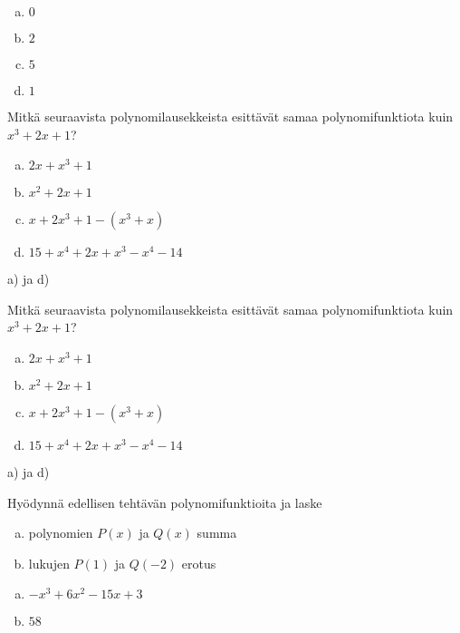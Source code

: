 \begin{tehtavasivu}
\begin{tehtava}
	\begin{vastaus}
		\begin{enumerate}[a)]
			\item $0$
			\item $2$
			\item $5$
			\item $1$
		\end{enumerate}
	\end{vastaus}
\end{tehtava}

\begin{tehtava}
	Mitkä seuraavista polynomilausekkeista esittävät samaa polynomifunktiota kuin
	$x^3+2x+1$?
	\begin{enumerate}[a)]
		\item $2x+x^3+1$
		\item $x^2+2x+1$
		\item $x+2x^3+1 - (x^3+x)$
		\item $15+x^4+2x+x^3-x^4-14$
	\end{enumerate}
	\begin{vastaus}
		a) ja d)
	\end{vastaus}
\end{tehtava}

\begin{tehtava}
	Mitkä seuraavista polynomilausekkeista esittävät samaa polynomifunktiota kuin
	$x^3+2x+1$?
	\begin{enumerate}[a)]
		\item $2x+x^3+1$
		\item $x^2+2x+1$
		\item $x+2x^3+1 - (x^3+x)$
		\item $15+x^4+2x+x^3-x^4-14$
	\end{enumerate}
	\begin{vastaus}
		a) ja d)
	\end{vastaus}
\end{tehtava}



\begin{tehtava}
	Hyödynnä edellisen tehtävän polynomifunktioita ja laske
	\begin{enumerate}[a)]
		 \item polynomien $P(x)$ ja $Q(x)$ summa
		 \item lukujen $P(1)$ ja $Q(-2)$ erotus
	\end{enumerate}
	
	\begin{vastaus}
		\begin{enumerate}[a)]
			\item $-x^3+6x^2-15x+3$
			\item $58$
	\end{enumerate}
	\end{vastaus}
\end{tehtava}



\end{tehtavasivu}
